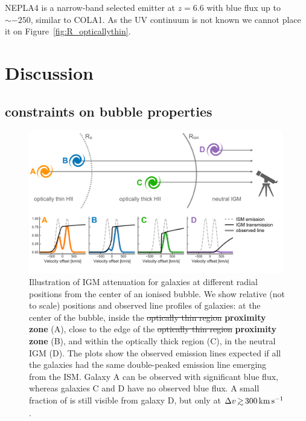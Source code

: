 \documentclass[fleqn,usenatbib]{mnras}
\providecommand{\DIFadd}[1]{{\protect\color{Green} {\bf #1}}} %
\providecommand{\DIFdel}[1]{{\protect\color{Gray} \scriptsize \sout{#1}}} %
\providecommand{\DIFaddFL}[1]{\DIFadd{#1}} %
\providecommand{\DIFdelFL}[1]{\DIFdel{#1}} %
\providecommand{\DIFaddbeginFL}{} %
\providecommand{\DIFaddendFL}{} %
\providecommand{\DIFdelbeginFL}{} %
\providecommand{\DIFdelendFL}{} %
\newcommand{\DIFscaledelfig}{0.5}
\newlength{\DIFdelgraphicswidth} %
\newlength{\DIFdelgraphicsheight} %
\newcommand{\DIFaddincludegraphics}[2][]{{\color{purple}\fbox{\DIFOincludegraphics[#1]{#2}}}} %
\newcommand{\DIFdelincludegraphics}[2][]{%
\sbox{\DIFdelgraphicsbox}{\DIFOincludegraphics[#1]{#2}}%
\settoboxwidth{\DIFdelgraphicswidth}{\DIFdelgraphicsbox} %
\settoboxtotalheight{\DIFdelgraphicsheight}{\DIFdelgraphicsbox} %
\scalebox{\DIFscaledelfig}{%
\parbox[b]{\DIFdelgraphicswidth}{\usebox{\DIFdelgraphicsbox}\\[-\baselineskip] \rule{\DIFdelgraphicswidth}{0em}}\llap{\resizebox{\DIFdelgraphicswidth}{\DIFdelgraphicsheight}{%
\setlength{\unitlength}{\DIFdelgraphicswidth}%
\begin{picture}(1,1)%
\thicklines\linethickness{2pt} %
{\color[rgb]{1,0,0}\put(0,0){\framebox(1,1){}}}%
{\color[rgb]{1,0,0}\put(0,0){\line( 1,1){1}}}%
{\color[rgb]{1,0,0}\put(0,1){\line(1,-1){1}}}%
\end{picture}%
}\hspace*{3pt}}} %
} %
\DeclareRobustCommand{\DIFaddbeginFL}{\DIFOaddbeginFL \let\includegraphics\DIFaddincludegraphics} %
\DeclareRobustCommand{\DIFaddendFL}{\DIFOaddendFL \let\includegraphics\DIFOincludegraphics} %
\DeclareRobustCommand{\DIFdelbeginFL}{\DIFOdelbeginFL \let\includegraphics\DIFdelincludegraphics} %
\DeclareRobustCommand{\DIFdelendFL}{\DIFOaddendFL \let\includegraphics\DIFOincludegraphics} %
\begin{document}
NEPLA4 \citep{Songaila2018} is a narrow-band selected \lya emitter at $z=6.6$ with blue flux up to $\sim-250$\kms, similar to COLA1. As the UV continuum is not known we cannot place it on Figure~\ref{fig:R_opticallythin}.

\section{Discussion}
\label{sec:disc}

\subsection{\lya constraints on bubble properties}
\label{sec:disc_redpeaks}

\begin{figure}
    \includegraphics[width=0.99\textwidth]{figs/fig8.pdf}
    \caption{Illustration of IGM attenuation for galaxies at different radial positions from the center of an ionised bubble. We show relative (not to scale) positions and observed line profiles of galaxies: at the center of the bubble, inside the \DIFdelbeginFL \DIFdelFL{optically thin region }\DIFdelendFL \DIFaddbeginFL \DIFaddFL{proximity zone }\DIFaddendFL (A), close to the edge of the \DIFdelbeginFL \DIFdelFL{optically thin region }\DIFdelendFL \DIFaddbeginFL \DIFaddFL{proximity zone }\DIFaddendFL (B), and within the optically thick region (C), in the neutral IGM (D). The plots show the observed \lya emission lines expected if all the galaxies had the same double-peaked emission line emerging from the ISM. Galaxy A can be observed with significant blue flux, whereas galaxies C and D have no observed blue flux. A small fraction of \lya is still visible from galaxy D, but only at $\DV\simgt300\kms$ .}
    \label{fig:cartoon}
\end{figure}
\end{document}
